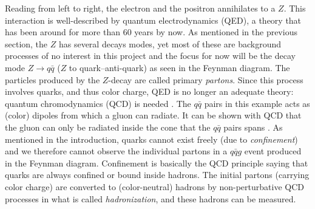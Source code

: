 Reading from left to right, the electron and the positron annihilates to a $Z$. This interaction is well-described by quantum electrodynamics (QED), a theory that has been around for more than 60 years by now. As mentioned in the previous section, the $Z$ has several decays modes, yet most of these are background processes of no interest in this project and the focus for now will be the decay mode $Z \rightarrow q\bar{q}$ ($Z$ to quark--anti-quark) as seen in the Feynman diagram. The particles produced by the $Z$-decay are called primary \emph{partons}. Since this process involves quarks, and thus color charge, QED is no longer an adequate theory: quantum chromodynamics (QCD) is needed \autocite{Armstrong1998hy}. The $q\bar{q}$ pairs in this example acts as (color) dipoles from which a gluon can radiate. It can be shown with QCD that the gluon can only be radiated inside the cone that the $q\bar{q}$ pairs spans \autocite{bierlichRopeHadronizationGeometry2016}. As mentioned in the introduction, quarks cannot exist freely (due to \emph{confinement}) and we therefore cannot observe the individual partons in a $q\bar{q}g$ event produced in the Feynman diagram. Confinement is basically the QCD principle saying that quarks are always confined or bound inside hadrons. The initial partons (carrying color charge) are converted to (color-neutral) hadrons by non-perturbative QCD processes in what is called \emph{hadronization}, and these hadrons can be measured. 

